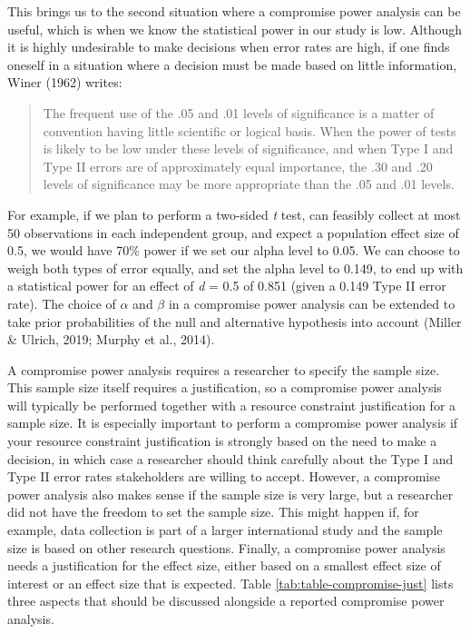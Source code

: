\documentclass[
  english,
  ,jou, a4paper,floatsintext]{apa6}
\begin{document}
This brings us to the second situation where a compromise power analysis can be useful, which is when we know the statistical power in our study is low. Although it is highly undesirable to make decisions when error rates are high, if one finds oneself in a situation where a decision must be made based on little information, Winer (1962) writes:

\begin{quote}
The frequent use of the .05 and .01 levels of significance is a matter of convention having little scientific or logical basis. When the power of tests is likely to be low under these levels of significance, and when Type I and Type II errors are of approximately equal importance, the .30 and .20 levels of significance may be more appropriate than the .05 and .01 levels.
\end{quote}

For example, if we plan to perform a two-sided \emph{t} test, can feasibly collect at most 50 observations in each independent group, and expect a population effect size of 0.5, we would have 70\% power if we set our alpha level to 0.05. We can choose to weigh both types of error equally, and set the alpha level to 0.149, to end up with a statistical power for an effect of \emph{d} = 0.5 of 0.851 (given a 0.149 Type II error rate). The choice of \(\alpha\) and \(\beta\) in a compromise power analysis can be extended to take prior probabilities of the null and alternative hypothesis into account (Miller \& Ulrich, 2019; Murphy et al., 2014).

A compromise power analysis requires a researcher to specify the sample size. This sample size itself requires a justification, so a compromise power analysis will typically be performed together with a resource constraint justification for a sample size. It is especially important to perform a compromise power analysis if your resource constraint justification is strongly based on the need to make a decision, in which case a researcher should think carefully about the Type I and Type II error rates stakeholders are willing to accept. However, a compromise power analysis also makes sense if the sample size is very large, but a researcher did not have the freedom to set the sample size. This might happen if, for example, data collection is part of a larger international study and the sample size is based on other research questions. Finally, a compromise power analysis needs a justification for the effect size, either based on a smallest effect size of interest or an effect size that is expected. Table \ref{tab:table-compromise-just} lists three aspects that should be discussed alongside a reported compromise power analysis.
\end{document}
